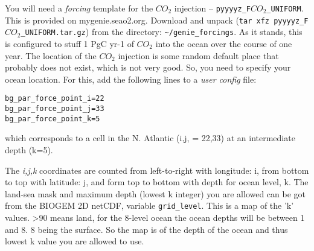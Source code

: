 \documentclass[11pt,fleqn]{book} %
\begin{document}
\vspace{1mm}
You will need a \textit{forcing} template for the \(CO_{2}\) injection -- \texttt{pyyyyz\_F\(CO_{2}\)\_UNIFORM}. This is provided on mygenie.seao2.org. Download and unpack (\texttt{tar xfz pyyyyz\_F\(CO_{2}\)\_UNIFORM.tar.gz}) from the directory: \texttt{\~{}/genie\_forcings}.
As it stands, this is configured to stuff 1 PgC yr-1 of \(CO_{2}\) into the ocean over the course of one year. The location of the \(CO_{2}\) injection is some random default place that probably does not exist, which is not very good. So, you need to specify your ocean location. For this, add the following lines to a \textit{user config} file:
\vspace{-2mm}\small\begin{verbatim}
bg_par_force_point_i=22
bg_par_force_point_j=33
bg_par_force_point_k=5
\end{verbatim}\normalsize\vspace{-2mm}
which corresponds to a cell in the N. Atlantic (i,j, = 22,33) at an intermediate depth (k=5).

The \textit{i,j,k} coordinates are counted from left-to-right with longitude: i, from bottom to top with latitude: j, and form top to bottom with depth for ocean level, k. The land-sea mask and maximum depth (lowest k integer) you are allowed can be got from the BIOGEM  2D netCDF, variable \texttt{grid\_level}. This is a map of the 'k' values. >90 means land, for the 8-level ocean the ocean depths will be between 1 and 8. 8 being the surface. So the map is of the depth of the ocean and thus lowest k value you are allowed to use.
\end{document}
